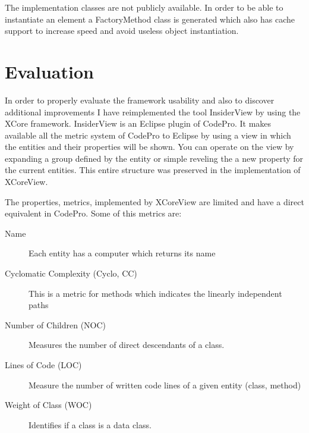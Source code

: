 \begin{figure}[h]
\centering
{}
\label{fig:xCorexTypeDialogBox}
\end{figure}

	The implementation classes are not publicly available.
In order to be able to instantiate an element a FactoryMethod class is
generated which also has cache support to increase speed and avoid useless
object instantiation.
	
\section {Evaluation}
		In order to properly evaluate the framework usability and also to discover 
additional improvements I have reimplemented the tool InsiderView by using the
XCore framework. InsiderView is an Eclipse plugin of CodePro. It makes available
all the metric system of CodePro to Eclipse by using a view in which the entities
and their properties will be shown. You can operate on the view by expanding a group
defined by the entity or simple reveling the a new property for the current
entities.
		This entire structure was preserved in the implementation of XCoreView.

		The properties, metrics, implemented by XCoreView are limited and have a
direct equivalent in CodePro. Some of this metrics are:
		
		\begin{description}
			\item[Name]  Each entity has a computer which returns its name
			\item[Cyclomatic Complexity (Cyclo, CC)]  {This is a metric for methods which
indicates the linearly independent paths}
			\item[Number of Children (NOC)] {Measures the number of direct descendants of
a class.}
			\item[Lines of Code (LOC)] Measure the number of written code lines of a
given entity (class, method)
			\item[Weight of Class (WOC)] Identifies if a class is a data class. 
		\end{description}
		
